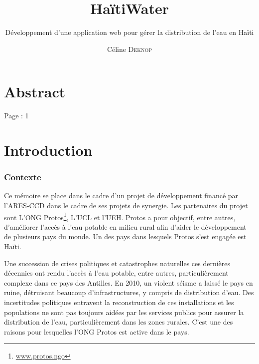 \documentclass{EPL-master-thesis-covers-FR}
\title{HaïtiWater}
\subtitle{Développement d'une application web pour gérer la distribution de l'eau en Haïti}
\author{Céline \textsc{Deknop}}
\begin{document}
	\maketitle
	\tableofcontents

	\setlength{\parskip}{1.5em plus1em minus1em}


	\chapter*{Abstract}

		Page : 1

	\chapter{Introduction}



		\subsection*{Contexte}

			Ce mémoire se place dans le cadre d'un projet de développement financé par l'ARES-CCD dans le cadre de ses projets de synergie. Les partenaires du projet sont L'ONG Protos\footnote{\href{https://www.protos.ngo/fr/}{www.protos.ngo}}, L'UCL et l'UEH. Protos a pour objectif, entre autres, d'améliorer l'accès à l'eau potable en milieu rural afin d'aider le développement de plusieurs pays du monde. Un des pays dans lesquels Protos s'est engagée est Haïti.

			Une succession de crises politiques et catastrophes naturelles ces dernières décennies ont rendu l'accès à l'eau potable, entre autres, particulièrement complexe dans ce pays des Antilles. En 2010, un violent séisme a laissé le pays en ruine, détruisant beaucoup d'infrastructures, y compris de distribution d'eau. Des incertitudes politiques entravent la reconstruction de ces installations et les populations ne sont pas toujours aidées par les services publics pour assurer la distribution de l'eau, particulièrement dans les zones rurales. C'est une des raisons pour lesquelles l'ONG Protos est active dans le pays.
\end{document}
